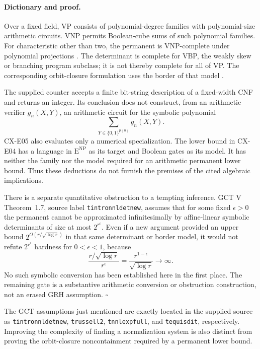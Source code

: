 \documentclass[11pt,a4paper]{article}
\begin{document}
\paragraph{Dictionary and proof.}
Over a fixed field, VP consists of polynomial-degree families with
polynomial-size arithmetic circuits. VNP permits Boolean-cube sums
of such polynomial families.
For characteristic other than two, the permanent is VNP-complete
under polynomial projections
\cite[Theorem~2, p.254]{Valiant1979}.
The determinant is complete for VBP, the weakly skew or branching
program subclass; it is not thereby complete for all of VP.
The corresponding orbit-closure formulation uses the border of
that model
\cite[Definitions~2.9, 2.25; Theorems~2.20, 2.29, 7.3]{Burgisser2024}.

The supplied counter accepts a finite bit-string description of a
fixed-width CNF and returns an integer.
Its conclusion does not construct, from an arithmetic verifier
\(g_n(X,Y)\), an arithmetic circuit for the symbolic polynomial
\[
 \sum_{Y\in\{0,1\}^{p(n)}}g_n(X,Y).
\]
CX-E05 also evaluates only a numerical specialization.
The lower bound in CX-E04 has a language in
\(\mathrm E^{\mathrm{NP}}\) as its target and Boolean gates as its
model. It has neither the family nor the model required for an
arithmetic permanent lower bound.
Thus these deductions do not furnish the premises of the cited
algebraic implications.

There is a separate quantitative obstruction to a tempting inference.
GCT V Theorem~1.7, source label \texttt{tintronnldetnew}, assumes
that for some fixed \(\epsilon>0\) the permanent cannot be approximated
infinitesimally by affine-linear symbolic determinants of size
at most \(2^{r^\epsilon}\).
Even if a new argument provided an upper bound
\(2^{O(r/\sqrt{\log r})}\) in that same determinant or border model,
it would not refute
\(2^{r^\epsilon}\) hardness for \(0<\epsilon<1\), because
\[
 \frac{r/\sqrt{\log r}}{r^\epsilon}
 =\frac{r^{1-\epsilon}}{\sqrt{\log r}}\longrightarrow\infty.
\]
No such symbolic conversion has been established here in the first
place.
The remaining gate is a substantive arithmetic conversion or
obstruction construction, not an erased GRH assumption.
\hfill\(\square\)

The GCT assumptions just mentioned are exactly located in the supplied
source as \texttt{tintronnldetnew}, \texttt{trussell2},
\texttt{tnnlexpfull}, and \texttt{tequisdit}, respectively.
Improving the complexity of finding a normalization system is also
distinct from proving the orbit-closure noncontainment required by a
permanent lower bound.
\end{document}
